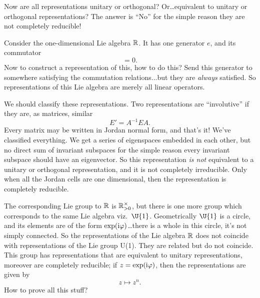Now are all representations unitary or orthogonal?
Or\dots equivalent to unitary or orthogonal representations? The
answer is ``No'' for the simple reason they are not completely
reducible!
\begin{ex}
Consider the one-dimensional Lie algebra $\Bbb{R}$. It has one
generator $e$, and its commutator
\begin{equation}
[e,e] = 0.
\end{equation}
Now to construct a representation of this, how to do this? Send
this generator to somewhere satisfying the commutation
relations...but they are \emph{always} satisfied. So
representations of this Lie algebra are merely all linear operators.
\end{ex}
We should classify these representations. Two representations are
``involutive'' if they are, as matrices, similar
\begin{equation}
E' = A^{-1}EA.
\end{equation}
Every matrix may be written in Jordan normal form, and that's it!
We've classified everything. We get a series of eigenspaces
embedded in each other, but no direct sum of invariant subspaces
for the simple reason every invariant subspace should have an
eigenvector. So this representation \emph{is not} equivalent to a
unitary or orthogonal representation, and it is not completely
irreducible. Only when all the Jordan cells are one dimensional,
then the representation is completely reducible.

The corresponding Lie group to $\Bbb{R}$ is
$\Bbb{R}^{\times}_{>0}$, but there is one more group which
corresponds to the same Lie algebra viz.\ $\U{1}$. Geometrically $\U{1}$
is a circle, and its elements are of the form
$\exp(\mathrm{i}\varphi)$\dots there is a whole in this circle, it's not
simply connected. So the representations of the Lie algebra
$\Bbb{R}$ does not coincide with representations of the Lie group
U(1). They are related but do not coincide. This group has
representations that are equivalent to unitary representations,
moreover are completely reducible; if $z=\exp(\mathrm{i}\varphi)$, then
the representations are given by
\begin{equation}
z\mapsto z^{n}.
\end{equation}
How to prove all this stuff?

